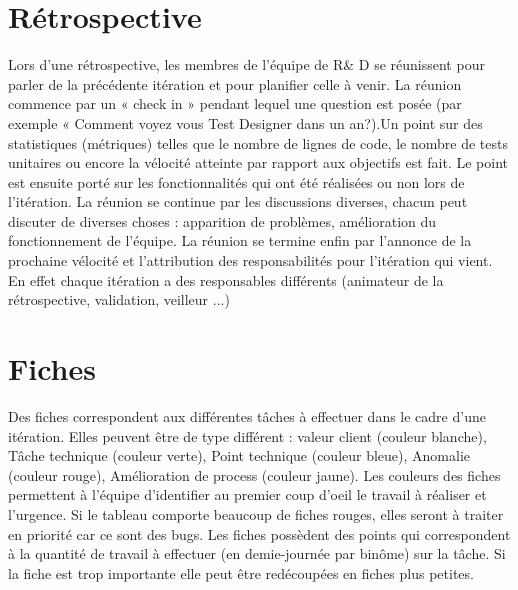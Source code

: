 \section{Rétrospective}
Lors d'une rétrospective,  les membres de l'équipe de R\& D se réunissent pour parler de la précédente itération et pour planifier celle à venir. La réunion commence par un « check in » pendant lequel une question est posée (par exemple « Comment voyez vous Test Designer dans un an?).Un point sur des statistiques (métriques) telles que le nombre de lignes de code, le nombre de tests unitaires ou encore la vélocité atteinte par rapport aux objectifs est fait. Le point est ensuite porté sur les fonctionnalités qui ont été réalisées ou non lors de l'itération. La réunion se continue par les discussions diverses, chacun peut discuter de diverses choses : apparition de problèmes, amélioration du fonctionnement de l'équipe. La réunion se termine enfin par l'annonce de la prochaine vélocité et l'attribution des responsabilités pour l'itération qui vient. En effet chaque itération a des responsables différents (animateur de la rétrospective, validation, veilleur ...)
\section{Fiches}\label{agile:fiches}
Des fiches correspondent aux différentes t\^aches à effectuer dans le cadre d'une itération. Elles peuvent \^etre de type différent : valeur client (couleur blanche), T\^ache technique (couleur verte), Point technique (couleur bleue), Anomalie (couleur rouge), Amélioration de process (couleur jaune). Les couleurs des fiches permettent à l'équipe d'identifier au premier coup d'oeil le travail à réaliser et l'urgence. Si le tableau comporte beaucoup de fiches rouges, elles seront à traiter en priorité car ce sont des bugs. Les fiches possèdent des points qui correspondent à la quantité de travail à effectuer (en demie-journée par bin\^ome) sur la t\^ache. Si la fiche est trop importante elle peut être redécoupées en fiches plus petites.

%
%

